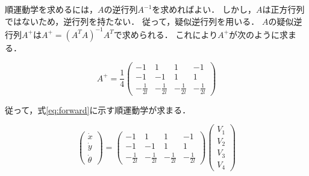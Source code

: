 \documentclass[../master]{subfiles}
\begin{document}
  順運動学を求めるには，$A$の逆行列$A^{-1}$を求めればよい．
  しかし，$A$は正方行列ではないため，逆行列を持たない．
  従って，疑似逆行列を用いる．
  $A$の疑似逆行列$A^{+}$は$A^{+} = (A^{T}A)^{-1}A^{T}$で求められる．
  これにより$A^{+}$が次のように求まる．

  \begin{equation}
    A^{+} = \frac{1}{4}
    \begin{pmatrix}
      -1 & 1 & 1 & -1 \\
      -1 & -1 & 1 & 1 \\
      -\frac{1}{2l} & -\frac{1}{2l} & -\frac{1}{2l} & -\frac{1}{2l}
    \end{pmatrix}
  \end{equation}

  従って，式\ref{eq:forward}に示す順運動学が求まる．

  \begin{equation}
    \begin{pmatrix}
      \dot{x} \\
      \dot{y} \\
      \dot{\theta}
    \end{pmatrix}
    =
    \begin{pmatrix}
      -1 & 1 & 1 & -1 \\
      -1 & -1 & 1 & 1 \\
      -\frac{1}{2l} & -\frac{1}{2l} & -\frac{1}{2l} & -\frac{1}{2l}
    \end{pmatrix}
    \begin{pmatrix}
      V_{1} \\ V_{2} \\ V_{3} \\ V_{4}
    \end{pmatrix}
    \label{eq:forward}
  \end{equation}
\end{document}
